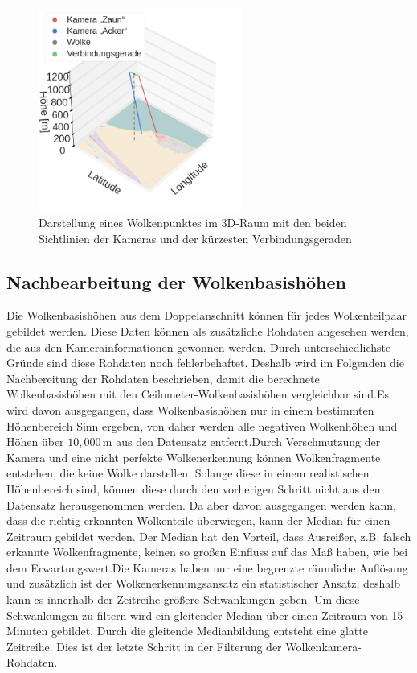 \documentclass[a4paper,11pt,twoside,german]{article}
\newcommand{\absatz}{\smallbreak}
\begin{document}
\begin{figure}[t]
\begin{center} 
\includegraphics[width=0.6\textwidth]{media/3d.png}
\caption[Darstellung des Doppelanschnitts]{Darstellung eines Wolkenpunktes im
3D-Raum mit den beiden Sichtlinien der Kameras und der kürzesten
Verbindungsgeraden}
\label{FIGDoppel3d}
\end{center}
\end{figure}

\subsection{Nachbearbeitung der Wolkenbasishöhen} \label{SECHeightPost} Die
Wolkenbasishöhen aus dem Doppelanschnitt können für jedes Wolkenteilpaar
gebildet werden. Diese Daten können als zusätzliche Rohdaten angesehen werden,
die aus den Kamerainformationen gewonnen werden. Durch unterschiedlichste Gründe
sind diese Rohdaten noch fehlerbehaftet. Deshalb wird im Folgenden die
Nachbereitung der Rohdaten beschrieben, damit die berechnete Wolkenbasishöhen
mit den Ceilometer-Wolkenbasishöhen vergleichbar sind.\absatz Es wird davon
ausgegangen, dass Wolkenbasishöhen nur in einem bestimmten Höhenbereich Sinn
ergeben, von daher werden alle negativen Wolkenhöhen und Höhen über
$10,000\,\mathrm{m}$ aus den Datensatz entfernt.\absatz Durch Verschmutzung der
Kamera und eine nicht perfekte Wolkenerkennung können Wolkenfragmente entstehen,
die keine Wolke darstellen. Solange diese in einem realistischen Höhenbereich
sind, können diese durch den vorherigen Schritt nicht aus dem Datensatz
herausgenommen werden. Da aber davon ausgegangen werden kann, dass die richtig
erkannten Wolkenteile überwiegen, kann der Median für einen Zeitraum gebildet
werden. Der Median hat den Vorteil, dass Ausreißer, z.B. falsch erkannte
Wolkenfragmente, keinen so großen Einfluss auf das Maß haben, wie bei dem
Erwartungswert.\absatz Die Kameras haben nur eine begrenzte räumliche Auflösung
und zusätzlich ist der Wolkenerkennungsansatz ein statistischer Ansatz, deshalb
kann es innerhalb der Zeitreihe größere Schwankungen geben. Um diese
Schwankungen zu filtern wird ein gleitender Median über einen Zeitraum von 15
Minuten gebildet. Durch die gleitende Medianbildung entsteht eine glatte
Zeitreihe. Dies ist der letzte Schritt in der Filterung der
Wolkenkamera-Rohdaten.\absatz
\end{document}
